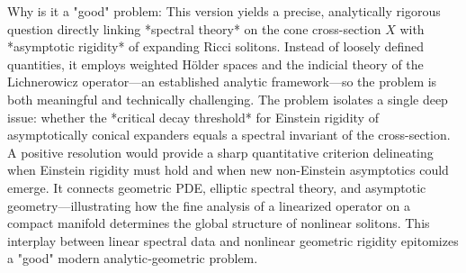 Why is it a "good" problem:  
This version yields a precise, analytically rigorous question directly linking *spectral theory* on the cone cross-section \(X\) with *asymptotic rigidity* of expanding Ricci solitons. Instead of loosely defined quantities, it employs weighted Hölder spaces and the indicial theory of the Lichnerowicz operator—an established analytic framework—so the problem is both meaningful and technically challenging.  
The problem isolates a single deep issue: whether the *critical decay threshold* for Einstein rigidity of asymptotically conical expanders equals a spectral invariant of the cross-section. A positive resolution would provide a sharp quantitative criterion delineating when Einstein rigidity must hold and when new non-Einstein asymptotics could emerge.  
It connects geometric PDE, elliptic spectral theory, and asymptotic geometry—illustrating how the fine analysis of a linearized operator on a compact manifold determines the global structure of nonlinear solitons. This interplay between linear spectral data and nonlinear geometric rigidity epitomizes a "good" modern analytic‑geometric problem.